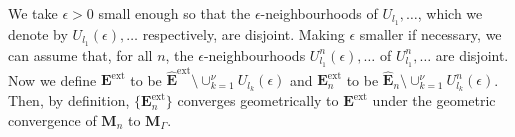 \documentclass{amsart}
\theoremstyle{definition}
\begin{document}
We take $\epsilon >0$ small enough so that the $\epsilon$-neighbourhoods of $U_{l_1}, \dots$, which we denote by $U_{l_1}(\epsilon), \dots $ respectively, are disjoint.
Making $\epsilon$ smaller if necessary, we can assume that, for all $n$, the $\epsilon$-neighbourhoods  $U^n_{l_1}(\epsilon), \dots$ of $U^n_{l_1}, \dots$  are disjoint.
Now we define $\mathbf E^\mathrm{ext}$ to be $\widehat{\mathbf E}^\mathrm{ext} \setminus \cup_{k=1}^\nu U_{l_k}(\epsilon)$ and $\mathbf E^\mathrm{ext}_n$ to be $\widehat{\mathbf E}_n \setminus \cup_{k=1}^\nu U^n_{l_k}(\epsilon)$.
Then, by definition, $\{\mathbf E^\mathrm{ext}_n\}$ converges geometrically to $\mathbf E^\mathrm{ext}$ under the geometric convergence of $\mathbf M_n$ to $\mathbf M_\Gamma$.
%
%
%
%
%
%
\end{document}
